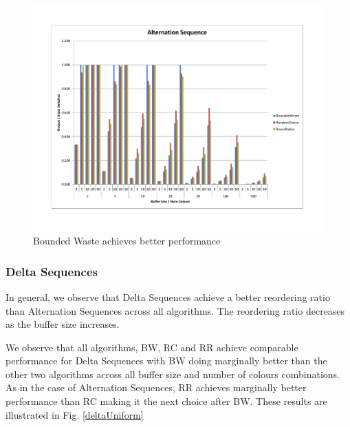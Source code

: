 \begin{figure}[ht]
\centering 
\includegraphics[scale=0.60]{Alternation-Uniform.pdf}
\caption{Bounded Waste achieves better performance}
\label{alternationUniformBW}
\end{figure}

\subsubsection{Delta Sequences}

In general, we observe that Delta Sequences achieve a better reordering ratio than Alternation Sequences across all algorithms. The reordering ratio decreases as the buffer size increases. 

We observe that all algorithms, BW, RC and RR achieve comparable performance for Delta Sequences with BW doing marginally better than the other two algorithms across all buffer size and number of colours combinations. As in the case of Alternation Sequences, RR achieves marginally better performance than RC making it the next choice after BW. These results are illustrated in Fig. \ref{deltaUniform}

